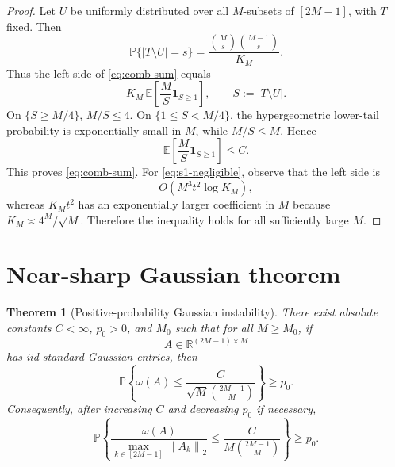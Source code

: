 \documentclass[11pt]{article}
\newtheorem{theorem}{Theorem}
\newcommand{\R}{\mathbb R}
\newcommand{\Pbb}{\mathbb P}
\newcommand{\Ebb}{\mathbb E}
\newcommand{\1}{\mathbf 1}
\newcommand{\norm}[1]{\left\lVert #1\right\rVert}
\begin{document}
\begin{proof}
Let \(U\) be uniformly distributed over all \(M\)-subsets of \([2M-1]\), with \(T\) fixed.
Then
\[
        \Pbb\{|T\setminus U|=s\}
        =
        \frac{\binom Ms\binom{M-1}s}{K_M}.
\]
Thus the left side of \eqref{eq:comb-sum} equals
\[
        K_M\,\Ebb\left[\frac{M}{S}\1_{S\ge1}\right],
        \qquad S:=|T\setminus U|.
\]
On \(\{S\ge M/4\}\), \(M/S\le4\).  On \(\{1\le S<M/4\}\), the hypergeometric lower-tail
probability is exponentially small in \(M\), while \(M/S\le M\).  Hence
\[
        \Ebb\left[\frac{M}{S}\1_{S\ge1}\right]\le C.
\]
This proves \eqref{eq:comb-sum}.  For \eqref{eq:s1-negligible}, observe that the left side
is
\[
        O\left(M^3t^2\log K_M\right),
\]
whereas \(K_Mt^2\) has an exponentially larger coefficient in \(M\) because
\(K_M\asymp 4^M/\sqrt M\).  Therefore the inequality holds for all sufficiently large
\(M\).
\end{proof}

\section{Near-sharp Gaussian theorem}
\label{sec:positive}

\begin{theorem}[Positive-probability Gaussian instability]
There exist absolute constants \(C<\infty\), \(p_0>0\), and \(M_0\) such that for all
\(M\ge M_0\), if
\[
        A\in\R^{(2M-1)\times M}
\]
has iid standard Gaussian entries, then
\begin{equation}
        \Pbb\left\{
        \omega(A)
        \le
        \frac{C}{\sqrt M\binom{2M-1}{M}}
        \right\}
        \ge
        p_0.
        \label{eq:gaussian-theorem-omega}
\end{equation}
Consequently, after increasing \(C\) and decreasing \(p_0\) if necessary,
\begin{equation}
        \Pbb\left\{
        \frac{\omega(A)}{\max_{k\in[2M-1]}\norm{A_k}_2}
        \le
        \frac{C}{M\binom{2M-1}{M}}
        \right\}
        \ge
        p_0.
        \label{eq:gaussian-theorem-normalized}
\end{equation}
\end{theorem}
\end{document}
